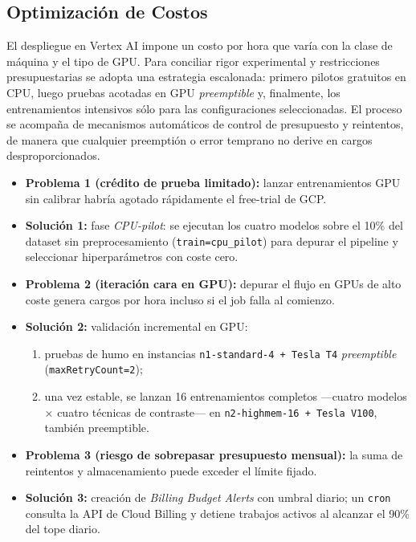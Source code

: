 \subsection{Optimización de Costos}

El despliegue en Vertex AI impone un costo por hora que varía con la clase de máquina y el tipo de GPU.
Para conciliar rigor experimental y restricciones presupuestarias se adopta una estrategia escalonada: primero pilotos gratuitos en CPU, luego pruebas acotadas en GPU \emph{preemptible} y, finalmente, los entrenamientos intensivos sólo para las configuraciones seleccionadas.
El proceso se acompaña de mecanismos automáticos de control de presupuesto y reintentos, de manera que cualquier preemptión o error temprano no derive en cargos desproporcionados.

\begin{itemize}
   \item \textbf{Problema 1 (crédito de prueba limitado):} lanzar entrenamientos GPU sin calibrar habría agotado rápidamente el free-trial de GCP.
   \item \textbf{Solución 1:} fase \textit{CPU-pilot}: se ejecutan los cuatro modelos sobre el 10\% del dataset sin preprocesamiento (\texttt{train=cpu\_pilot}) para depurar el pipeline y seleccionar hiperparámetros con coste cero.

   \item \textbf{Problema 2 (iteración cara en GPU):} depurar el flujo en GPUs de alto coste genera cargos por hora incluso si el job falla al comienzo.
   \item \textbf{Solución 2:} validación incremental en GPU:
         \begin{enumerate}
           \item pruebas de humo en instancias \texttt{n1-standard-4 + Tesla T4} \emph{preemptible} (\texttt{maxRetryCount=2});
           \item una vez estable, se lanzan 16 entrenamientos completos —cuatro modelos × cuatro técnicas de contraste— en \texttt{n2-highmem-16 + Tesla V100}, también preemptible.
         \end{enumerate}

   \item \textbf{Problema 3 (riesgo de sobrepasar presupuesto mensual):} la suma de reintentos y almacenamiento puede exceder el límite fijado.
   \item \textbf{Solución 3:} creación de \textit{Billing Budget Alerts} con umbral diario; un \texttt{cron} consulta la API de Cloud Billing y detiene trabajos activos al alcanzar el 90\% del tope diario.
\end{itemize}

